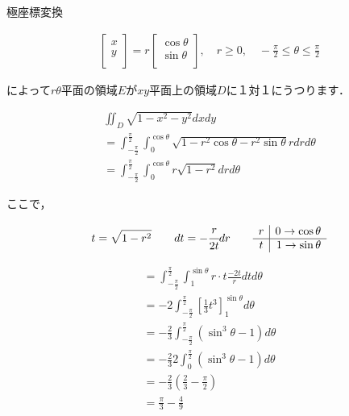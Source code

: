 \documentclass[a4paper,10pt]{jarticle}
\begin{document}
\begin{enumerate}
極座標変換
\begin{fleqn}[30pt] \begin{gather*}
 	\left[ \begin{array}{r}
		x \\
		y \\
	\end{array}  \right]
	= r
 	\left[ \begin{array}{r}
		\cos{\theta} \\
		\sin{\theta} \\
	\end{array}  \right]
	,\quad r \geq 0 , \quad -\frac{\pi}{2} \leq \theta \leq \frac{\pi}{2}
\end{gather*} \end{fleqn}
によって$r\theta$平面の領域$E$が$xy$平面上の領域$D$に１対１にうつります．
\begin{fleqn}[30pt] \begin{gather*}
	\iint_{D} \sqrt{1-x^2-y^2}dxdy \\
	=\int^{\frac{\pi}{2}}_{-\frac{\pi}{2}} \int^{\cos{\theta}}_0 \sqrt{1-r^2\cos{\theta}-r^2\sin{\theta}} r dr d\theta\\
	=\int^{\frac{\pi}{2}}_{-\frac{\pi}{2}} \int^{\cos{\theta}}_0 r\sqrt{1-r^2} drd\theta
\end{gather*} \end{fleqn}
ここで，
\begin{fleqn}[60pt] \begin{gather*}
	t=\sqrt{1-r^2} \qquad
	dt=-\cfrac{r}{2t}dr \qquad
	\begin{array}{c|r}
		r & 0 \to \cos{\theta} \\ \hline
		t & 1 \to \sin{\theta}
	\end{array}
\end{gather*} \end{fleqn}
\begin{fleqn}[30pt] \begin{gather*}
	=\int^{\frac{\pi}{2}}_{-\frac{\pi}{2}} \int^{\sin{\theta}}_1 r \cdot t \frac{-2t}{r} dt d\theta\\
	=-2 \int^{\frac{\pi}{2}}_{-\frac{\pi}{2}} \left[ \frac{1}{3}t^3 \right]^{\sin{\theta}}_1 d\theta \\
	=-\frac{2}{3} \int^{\frac{\pi}{2}}_{-\frac{\pi}{2}} ( \sin^3{\theta} - 1 ) d\theta \\
	= -\frac{2}{3} 2\int^{\frac{\pi}{2}}_{0}  ( \sin^3{\theta} - 1 ) d\theta \\
	=-\frac{2}{3} \left( \frac{2}{3} - \frac{\pi}{2} \right) \\
	= \frac{\pi}{3}- \frac{4}{9}
\end{gather*} \end{fleqn}
\end{enumerate}
\end{document}
